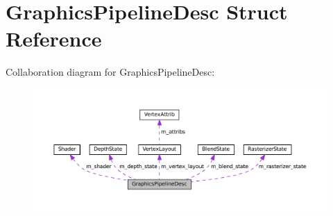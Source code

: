 \hypertarget{structGraphicsPipelineDesc}{}\section{Graphics\+Pipeline\+Desc Struct Reference}
\label{structGraphicsPipelineDesc}


Collaboration diagram for Graphics\+Pipeline\+Desc\+:\nopagebreak
\begin{figure}[H]
\begin{center}
\leavevmode
\includegraphics[width=350pt]{structGraphicsPipelineDesc__coll__graph}
\end{center}
\end{figure}
